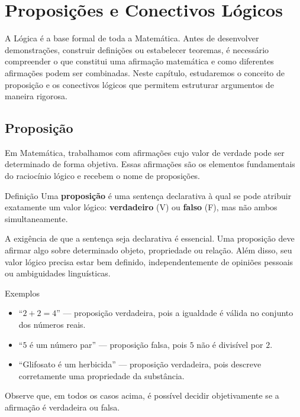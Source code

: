 \documentclass[12pt,a4paper,openright]{book}
\begin{document}
\chapter{Proposições e Conectivos Lógicos}

A Lógica é a base formal de toda a Matemática. Antes de desenvolver demonstrações, construir definições ou estabelecer teoremas, é necessário compreender o que constitui uma afirmação matemática e como diferentes afirmações podem ser combinadas. Neste capítulo, estudaremos o conceito de proposição e os conectivos lógicos que permitem estruturar argumentos de maneira rigorosa.

\section{Proposição}

Em Matemática, trabalhamos com afirmações cujo valor de verdade pode ser determinado de forma objetiva. Essas afirmações são os elementos fundamentais do raciocínio lógico e recebem o nome de proposições.

\begin{block}{Definição}
Uma \textbf{proposição} é uma sentença declarativa à qual se pode atribuir exatamente um valor lógico: \textbf{verdadeiro} (V) ou \textbf{falso} (F), mas não ambos simultaneamente.
\end{block}

A exigência de que a sentença seja declarativa é essencial. Uma proposição deve afirmar algo sobre determinado objeto, propriedade ou relação. Além disso, seu valor lógico precisa estar bem definido, independentemente de opiniões pessoais ou ambiguidades linguísticas.

\begin{block}{Exemplos}
\begin{itemize}
    \item “$2 + 2 = 4$” — proposição verdadeira, pois a igualdade é válida no conjunto dos números reais.
    \item “$5$ é um número par” — proposição falsa, pois $5$ não é divisível por $2$.
    \item “Glifosato é um herbicida” — proposição verdadeira, pois descreve corretamente uma propriedade da substância.
\end{itemize}
\end{block}

Observe que, em todos os casos acima, é possível decidir objetivamente se a afirmação é verdadeira ou falsa.
\end{document}
